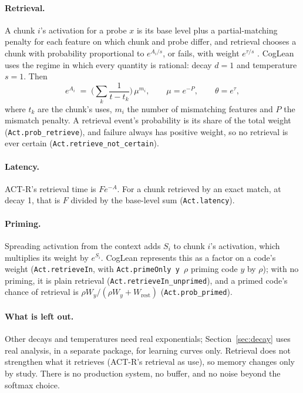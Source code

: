 \documentclass[11pt]{article}
\newcommand{\lean}[1]{\texttt{#1}}
\begin{document}
\paragraph{Retrieval.} A chunk $i$'s activation for a probe $x$ is its base level plus a partial-matching penalty for each feature on which chunk and probe differ, and retrieval chooses a chunk with probability proportional to $e^{A_i/s}$, or fails, with weight $e^{\tau/s}$ \citep{anderson1998}. CogLean uses the regime in which every quantity is rational: decay $d = 1$ and temperature $s = 1$. Then
\[
  e^{A_i} \;=\; \Big(\sum_k \frac{1}{t - t_k}\Big)\,\mu^{m_i}, \qquad \mu = e^{-P}, \qquad \theta = e^{\tau},
\]
where $t_k$ are the chunk's uses, $m_i$ the number of mismatching features and $P$ the mismatch penalty. A retrieval event's probability is its share of the total weight (\lean{Act.prob\_retrieve}), and failure always has positive weight, so no retrieval is ever certain (\lean{Act.retrieve\_not\_certain}).

\paragraph{Latency.} ACT-R's retrieval time is $F e^{-A}$. For a chunk retrieved by an exact match, at decay 1, that is $F$ divided by the base-level sum (\lean{Act.latency}).

\paragraph{Priming.} Spreading activation from the context adds $S_i$ to chunk $i$'s activation, which multiplies its weight by $e^{S_i}$. CogLean represents this as a factor on a code's weight (\lean{Act.retrieveIn}, with \lean{Act.primeOnly~y~$\rho$} priming code $y$ by $\rho$); with no priming, it is plain retrieval (\lean{Act.retrieveIn\_unprimed}), and a primed code's chance of retrieval is $\rho W_y/(\rho W_y + W_{\text{rest}})$ (\lean{Act.prob\_primed}).

\paragraph{What is left out.} Other decays and temperatures need real exponentials; Section~\ref{sec:decay} uses real analysis, in a separate package, for learning curves only. Retrieval does not strengthen what it retrieves (ACT-R's retrieval as use), so memory changes only by study. There is no production system, no buffer, and no noise beyond the softmax choice.
\end{document}
